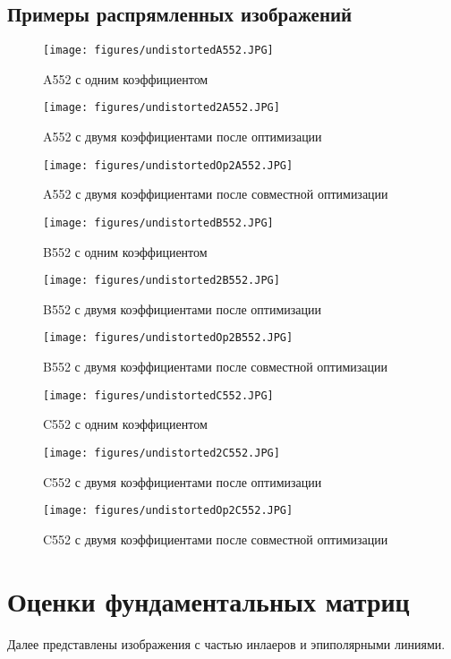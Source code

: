 \subsection{Примеры распрямленных изображений}
\begin{figure}[H]
	\centering 
	\texttt{[image: figures/undistortedA552.JPG]}
	\caption{A552 с одним коэффициентом}
\end{figure}
\begin{figure}[H]
	\centering 
	\texttt{[image: figures/undistorted2A552.JPG]}
	\caption{A552 с двумя коэффициентами после оптимизации}
\end{figure}
\begin{figure}[H]
	\centering 
	\texttt{[image: figures/undistortedOp2A552.JPG]}
	\caption{A552 с двумя коэффициентами после совместной оптимизации}
\end{figure}
\begin{figure}[H]
	\centering 
	\texttt{[image: figures/undistortedB552.JPG]}
	\caption{B552 с одним коэффициентом}
\end{figure}
\begin{figure}[H]
	\centering 
	\texttt{[image: figures/undistorted2B552.JPG]}
	\caption{B552 с двумя коэффициентами после оптимизации}
\end{figure}
\begin{figure}[H]
	\centering 
	\texttt{[image: figures/undistortedOp2B552.JPG]}
	\caption{B552 с двумя коэффициентами после совместной оптимизации}
\end{figure}
\begin{figure}[H]
	\centering 
	\texttt{[image: figures/undistortedC552.JPG]}
	\caption{C552 с одним коэффициентом}
\end{figure}
\begin{figure}[H]
	\centering 
	\texttt{[image: figures/undistorted2C552.JPG]}
	\caption{C552 с двумя коэффициентами после оптимизации}
\end{figure}
\begin{figure}[H]
	\centering 
	\texttt{[image: figures/undistortedOp2C552.JPG]}
	\caption{C552 с двумя коэффициентами после совместной оптимизации}
\end{figure}

\section{Оценки фундаментальных матриц}
Далее представлены изображения с частью инлаеров и эпиполярными линиями.

